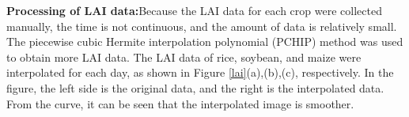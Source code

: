 \documentclass[acmsmall,manuscript, screen, review]{acmart}
\begin{document}
\textbf{Processing of LAI data:}Because the LAI data for each crop were collected manually, the time is not continuous, and the amount of data is relatively small. The piecewise cubic Hermite interpolation polynomial (PCHIP) method was used to obtain more LAI data.  The LAI data of rice, soybean, and maize were interpolated for each day, as shown in Figure \ref{lai}(a),(b),(c), respectively. In the figure, the left side is the original data, and the right is the interpolated data. From the curve, it can be seen that the interpolated image is smoother.

\begin{figure}[htbp]
  \centering
  \hfill


\end{figure}
\end{document}
